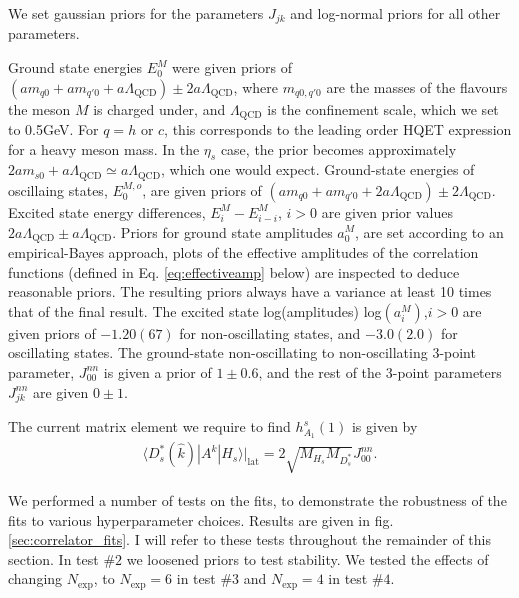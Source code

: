 We set gaussian priors for the parameters $J_{jk}$ and log-normal priors for all other parameters.

Ground state energies $E_0^M$ were given priors of $(am_{q0} + am_{q'0} + a\Lambda_{\text{QCD}} )\pm 2a\Lambda_{\text{QCD}}$, where $m_{q0,q'0}$ are the masses of the flavours the meson $M$ is charged under, and $\Lambda_{\text{QCD}}$ is the confinement scale, which we set to 0.5GeV. For $q=h$ or $c$, this corresponds to the leading order HQET expression for a heavy meson mass. In the $\eta_s$ case, the prior becomes approximately $2am_{s0} + a\Lambda_{\text{QCD}} \simeq a\Lambda_{\text{QCD}}$, which one would expect. Ground-state energies of oscillaing states, $E_0^{M,o}$, are given priors of $(am_{q0} + am_{q'0} + 2 a\Lambda_{\text{QCD}})\pm 2\Lambda_{\text{QCD}}$. Excited state energy differences, $E_i^M-E_{i-i}^M$, $i>0$ are given prior values $2a\Lambda_{\text{QCD}}\pm a\Lambda_{\text{QCD}}$. Priors for ground state amplitudes $a_0^M$, are set according to an empirical-Bayes approach, plots of the effective amplitudes of the correlation functions (defined in Eq. \ref{eq:effectiveamp} below) are inspected to deduce reasonable priors. The resulting priors always have a variance at least 10 times that of the final result. The excited state log(amplitudes) log$(a_i^M)$,$i>0$ are given priors of $-1.20(67)$ for non-oscillating states, and $-3.0(2.0)$ for oscillating states. The ground-state non-oscillating to non-oscillating 3-point parameter, $J_{00}^{nn}$ is given a prior of $1\pm 0.6$, and the rest of the 3-point parameters $J_{jk}^{nn}$ are given $0\pm 1$.

The current matrix element we require to find $h_{A_1}^s(1)$ is given by
\begin{align}
  \langle D_s^*(\hat{k}) | A^k | H_s \rangle |_{\text{lat}} = 2 \sqrt{M_{H_s}M_{D_s^*}} J^{nn}_{00}.
  \label{eq:currentfit}
\end{align}

We performed a number of tests on the fits, to demonstrate the robustness of the fits to various hyperparameter choices. Results are given in fig. \ref{sec:correlator_fits}. I will refer to these tests throughout the remainder of this section. In test $\#2$ we loosened priors to test stability. We tested the effects of changing $N_{\text{exp}}$, to $N_{\text{exp}}=6$ in test $\#3$ and $N_{\text{exp}}=4$ in test $\#4$.

